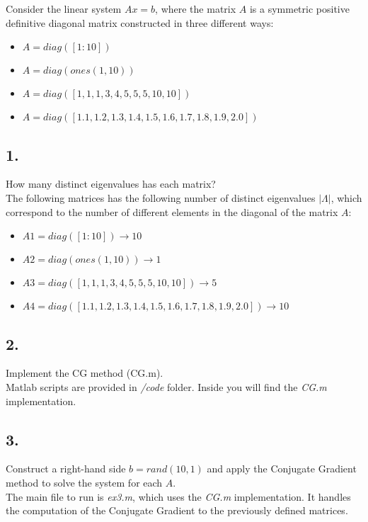 \documentclass[unicode,11pt,a4paper,oneside,numbers=endperiod,openany]{scrartcl}
\begin{document}
Consider the linear system $Ax = b$,
where the matrix $A$ is a symmetric positive definitive diagonal matrix
constructed in three different ways:

\begin{itemize}
    \item[ ] $A = diag([1:10])$
    \item[ ] $A = diag(ones(1,10))$
    \item[ ] $A = diag([1, 1, 1, 3, 4, 5, 5, 5, 10, 10])$
    \item[ ] $A = diag([1.1, 1.2, 1.3, 1.4, 1.5, 1.6, 1.7, 1.8, 1.9, 2.0])$
\end{itemize}

\subsection*{1.}
How many distinct eigenvalues has each matrix?\\

The following matrices has the following number of distinct eigenvalues $| \Lambda |$,
which correspond to the number of different elements in the diagonal of the matrix $A$:
\begin{itemize}
    \item[ ] $A1 = diag([1:10]) \rightarrow 10$
    \item[ ] $A2 = diag(ones(1,10)) \rightarrow 1$
    \item[ ] $A3 = diag([1, 1, 1, 3, 4, 5, 5, 5, 10, 10]) \rightarrow 5$
    \item[ ] $A4 = diag([1.1, 1.2, 1.3, 1.4, 1.5, 1.6, 1.7, 1.8, 1.9, 2.0]) \rightarrow 10$
\end{itemize}

\subsection*{2.}
Implement the CG method (CG.m).\\

Matlab scripts are provided in \textit{/code} folder.
Inside you will find the \textit{CG.m} implementation.

\subsection*{3.}
Construct a right-hand side $b = rand(10,1)$
and apply the Conjugate Gradient method to solve the system for each $A$.\\

The main file to run is \textit{ex3.m}, which uses the \textit{CG.m} implementation.
It handles the computation of the Conjugate Gradient to the previously defined matrices.
\end{document}
